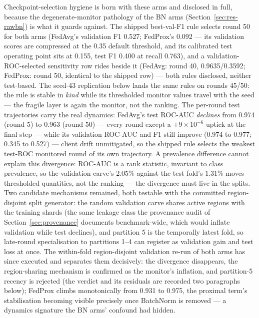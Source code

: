 Checkpoint-selection hygiene is born with these arms and disclosed
in full, because the degenerate-monitor pathology of the BN arms
(Section~\ref{sec:res-rawbn}) is what it guards against. The
shipped best-val-F1 rule selects round 50 for both arms (FedAvg's
validation F1 0.527; FedProx's 0.092 --- its validation scores are
compressed at the 0.35 default threshold, and its calibrated test
operating point sits at 0.155, test F1 0.400 at recall 0.763), and a
validation-ROC-selected sensitivity row rides beside it (FedAvg:
round 40, 0.9635/0.3592; FedProx: round 50, identical to the shipped
row) --- both rules disclosed, neither test-based. The seed-43
replication below lands the same rules on rounds 45/50: the rule is
stable in \emph{kind} while its thresholded monitor values travel
with the seed --- the fragile layer is again the monitor, not the
ranking. The per-round
test trajectories carry the real dynamics: FedAvg's test ROC-AUC
\emph{declines} from 0.974 (round 5) to 0.963 (round 50) --- every
round except a $+9\times10^{-6}$ uptick at the final step --- while
its validation ROC-AUC and F1 still improve (0.974 to 0.977;
0.345 to 0.527) --- client drift unmitigated, so the shipped rule
selects the weakest test-ROC monitored round of its own
trajectory. A prevalence difference cannot explain this
divergence: ROC-AUC is a rank statistic, invariant to class
prevalence, so the validation carve's 2.05\% against the test
fold's 1.31\% moves thresholded quantities, not the ranking --- the
divergence must live in the splits. Two candidate mechanisms
remained, both testable with the committed region-disjoint split
generator: the random validation carve shares active regions with
the training shards (the same leakage class the provenance audit
of Section~\ref{sec:provenance} documents benchmark-wide, which
would inflate validation while test declines), and partition 5 is
the temporally latest fold, so late-round specialisation to
partitions 1--4 can register as validation gain and test loss at
once. The within-fold region-disjoint validation re-run of both
arms has since executed and separates them decisively: the
divergence disappears, the region-sharing mechanism is confirmed
as the monitor's inflation, and partition-5 recency is rejected
(the verdict and its residuals are recorded two paragraphs below);
FedProx climbs monotonically from
0.931 to 0.975, the proximal term's stabilisation becoming visible
precisely once BatchNorm is removed --- a dynamics signature the BN
arms' confound had hidden.

